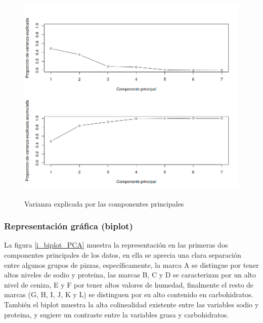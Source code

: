 \begin{figure}[h]
\centering
	\includegraphics[scale=.5]{images/varPCA.png} 
	\label{i_var_PCA}
	\caption{Varianza explicada por las componentes principales}
\end{figure}

\subsubsection{Representación gráfica (biplot)}

La figura  \ref{i_biplot_PCA} muestra la representación en las primeras dos componentes principales de los datos, en ella se aprecia una clara separación entre algunos grupos de pizzas, específicamente, la marca A se distingue por tener altos niveles de sodio y proteina, las marcas B, C y D se caracterizan por un alto nivel de ceniza, E y F por tener altos valores de humedad, finalmente el resto de marcas (G, H, I, J, K y L) se distinguen por su alto contenido en carbohidratos. 
También el biplot muestra la alta colinealidad existente entre las variables sodio y proteina, y sugiere un contraste entre la variables grasa y carbohidratos.



